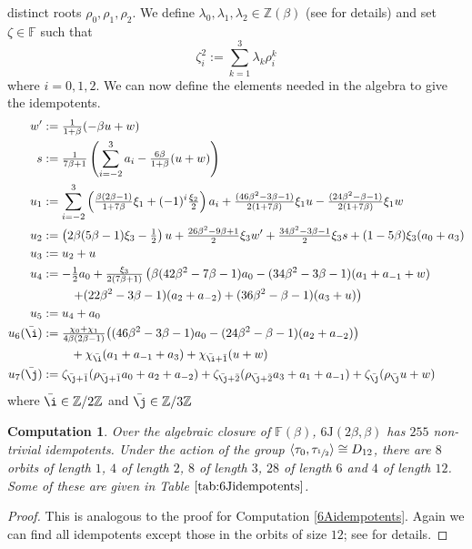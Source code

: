 \documentclass[11pt, a4paper]{article}
\theoremstyle{plain}
\newtheorem{computation}[theorem]{Computation}
\theoremstyle{definition}
\newcommand\bt{\beta}
\newcommand\lm{\lambda}
\newcommand\la{\langle}
\newcommand\ra{\rangle}
\newcommand\Z{\mathbb{Z}}
\newcommand\FF{\mathbb{F}}
\newcommand{\J}{\mathrm{J}}
\newcommand{\0}{\overline{0}}
\newcommand{\2}{\overline{2}}
\newcommand{\half}{{\tau_{\sfrac{1}{2}}}} %
\newcommand{\1}{\mathbbm{1}}
\newcommand{\rt}{\xi}
\begin{document}
distinct roots $\rho_0, \rho_1, \rho_2$. We define $\lm_0, \lm_1, \lm_2 \in \Z(\bt)$ (see \cite[\texttt{6J idempotents.m}]{githubcode} for details) and set $\zeta \in \FF$ such that
\[
\zeta_i^2 := \sum_{k=1}^3 \lm_k \rho_i^k
\]
where $i = 0,1,2$.  We can now define the elements needed in the algebra to give the idempotents.
\begin{align*}
	w' &:= \tfrac{1}{1+\bt}(-\bt u +w) \\
	s &:= \tfrac{1}{7\bt +1}\left( \sum_{i=-2}^3 a_i -\tfrac{6\bt}{1+\bt}(u+w) \right)\\
	u_1 &:= \sum_{i=-2}^{3} \left(\tfrac{\bt(2\bt-1)}{1+7\bt}\rt_1+(-1)^i\tfrac{\rt_2}{2}\right)a_i + \tfrac{(46\bt^2-3\bt-1)}{2(1+7\bt)}\rt_1 u -\tfrac{(24\bt^2-\bt-1)}{2(1+7\bt)}\rt_1 w \\
	u_2 &:= \left(2\bt(5\bt-1)\rt_3-\tfrac{1}{2}\right)u+\tfrac{26\bt^2-9\bt+1}{2}\rt_3 w' + \tfrac{34\bt^2-3\bt-1}{2}\rt_3 s +(1-5\bt)\rt_3(a_0+a_3)\\
	u_3 &:= u_2 + u \\
	u_4 &:= -\tfrac{1}{2} a_0 + \tfrac{\rt_3}{2(7\bt+1)} \left( \bt (42 \bt^2 - 7 \bt - 1)a_0  - (34\bt^2 - 3\bt - 1)(a_1 + a_{-1} + w) \right. \\
	&\phantom{{}={}} \quad \left. + (22\bt^2-3\bt-1)(a_2+a_{-2}) + (36\bt^2-\bt-1)(a_3 + u)\right) \\
	u_5 &:= u_4 + a_0 \\
	u_6(\bar{\i}) &:= \tfrac{\chi_0+\chi_1}{4\bt(2\bt-1)}\big( (46\bt^2-3\bt-1)a_0 - (24\bt^2-\bt-1)(a_2+a_{-2}) \big)  \\
	&\phantom{{}={}} \quad + \chi_{\bar{\i}}(a_1+a_{-1} + a_3) + \chi_{\bar{\i}+\bar{1}}(u+w) \\
	u_7(\bar{\j}) &:= \zeta_{\bar{\j} + \bar{1}}( \rho_{\bar{\j} + \bar{1}}a_0 + a_2 + a_{-2})  + \zeta_{\bar{\j} + \bar{2}}(\rho_{\bar{\j} + \bar{2}}a_3 + a_1+a_{-1}) + \zeta_{\bar{\j}}(\rho_{\bar{\j}}u + w)
\end{align*}
where $\bar{\i} \in \Z/2\Z$ and $\bar{\j} \in \Z/3\Z$



\begin{computation}
Over the algebraic closure of $\FF(\bt)$, $6\J(2\bt,\bt)$ has $255$ non-trivial idempotents.  Under the action of the group $\la \tau_0, \half \ra \cong D_{12}$, there are $8$ orbits of length $1$, $4$ of length $2$, $8$ of length $3$, $28$ of length $6$ and $4$ of length $12$.  Some of these are given in Table $\ref{tab:6Jidempotents}$.
\end{computation}
\begin{proof}
This is analogous to the proof for Computation \ref{6Aidempotents}.  Again we can find all idempotents except those in the orbits of size $12$; see \cite[\texttt{6J find idempotents.m}, \texttt{6J idempotents.m}]{githubcode} for details.
\end{proof}
\end{document}
